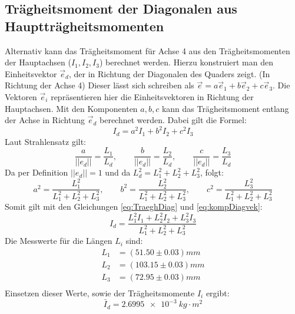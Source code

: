 \documentclass{report}
\begin{document}
\subsection{Trägheitsmoment der Diagonalen aus Hauptträgheitsmomenten}
Alternativ kann das Trägheitsmoment für Achse 4 aus den Trägheitsmomenten der Hauptachsen ($I_1, I_2, I_3$) berechnet werden.
Hierzu konstruiert man den Einheitsvektor $\vec{e}_d$, der in Richtung der Diagonalen des Quaders zeigt. (In Richtung der Achse 4)
Dieser lässt sich schreiben als $\vec{e} = a\vec{e}_1 + b\vec{e}_2 + c\vec{e}_3$. Die Vektoren $\vec{e}_i$ repräsentieren hier die Einheitsvektoren
in Richtung der Hauptachsen.
Mit den Komponenten $a, b, c$ kann das Trägheitsmoment entlang der Achse in Richtung $\vec{e}_d$ berechnet werden.
Dabei gilt die Formel:
\begin{equation}
    I_d = a^2I_1 + b^2I_2 + c^2I_3
    \label{eq:TraeghDiag}
\end{equation}
Laut Strahlensatz gilt:
\begin{equation}
    \frac{a}{||e_d||} = \frac{L_1}{L_d}, \qquad \frac{b}{||e_d||} = \frac{L_2}{L_d}, \qquad \frac{c}{||e_d||} = \frac{L_3}{L_d}
\end{equation}
Da per Definition $||e_d|| = 1$ und da $L_d^2 = L_1^2 + L_2^2 + L_3^2$, folgt:
\begin{equation}
    a^2 = \frac{L_1^2}{L_1^2 + L_2^2 + L_3^2}, \qquad b^2 = \frac{L_2^2}{L_1^2 + L_2^2 + L_3^2}, \qquad c^2 = \frac{L_3^2}{L_1^2 + L_2^2 + L_3^2}
    \label{eq:kompDiagvek}
\end{equation}
Somit gilt mit den Gleichungen \ref{eq:TraeghDiag} und \ref{eq:kompDiagvek}:
\begin{equation}
    I_d = \frac{L_1^2 I_1 + L_2^2 I_2 + L_3^2 I_3}{L_1^2 + L_2^2 + L_3^2}
    \label{eq:DiagFormel}
\end{equation}
Die Messwerte für die Längen $L_i$ sind:
\begin{equation}
    \begin{split}
        L_1 &= (51.50 \pm 0.03)mm \\
        L_2 &= (103.15 \pm 0.03)mm \\
        L_3 &= (72.95 \pm 0.03)mm \\
    \end{split}
\end{equation}
Einsetzen dieser Werte, sowie der Trägheitsmomente $I_i$ ergibt:
\begin{equation}
    \bar{I}_d = \qty{2.6995e-3}{kg \cdot m^2}
\end{equation}
\end{document}
